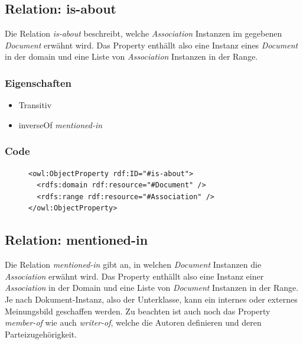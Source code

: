 \documentclass[
    11pt,
    latin1,
    a4paper,
    oneside
]{scrreprt}
\begin{document}
\subsection{Relation: is-about} \label{sec:rel_isabout}

Die Relation \emph{is-about} beschreibt, welche \emph{Association} Instanzen im gegebenen \emph{Document} erw\"ahnt wird. Das Property enth\"allt also eine Instanz eines \emph{Document} in der domain und eine Liste von \emph{Association} Instanzen in der Range.

\subsubsection{Eigenschaften} \label{sec:rel_isabout_settings}

\begin{itemize}
  \item Transitiv
  \item inverseOf \emph{mentioned-in}
\end{itemize}

\subsubsection{Code} \label{sec:rel_isabout_code}

\begin{figure}[H]
 \lstset{language=XML}
 \begin{lstlisting}[label=owl:isabout,caption={Die Relation \emph{is-about} gibt an, \"uber welche \emph{Association} ein Dokument ist}]
<owl:ObjectProperty rdf:ID="#is-about">
  <rdfs:domain rdf:resource="#Document" />
  <rdfs:range rdf:resource="#Association" />
</owl:ObjectProperty>
 \end{lstlisting}
\end{figure}


\subsection{Relation: mentioned-in} \label{sec:rel_mentionedin}

Die Relation \emph{mentioned-in} gibt an, in welchen \emph{Document} Instanzen die \emph{Association} erw\"ahnt wird. Das Property enth\"allt also eine Instanz einer \emph{Association} in der Domain und eine Liste von \emph{Document} Instanzen in der Range. Je nach Dokument-Instanz, also der Unterklasse, kann ein internes oder externes Meinungsbild geschaffen werden. Zu beachten ist auch noch das Property \emph{member-of} wie auch \emph{writer-of}, welche die Autoren definieren und deren Parteizugeh\"origkeit.
\end{document}
